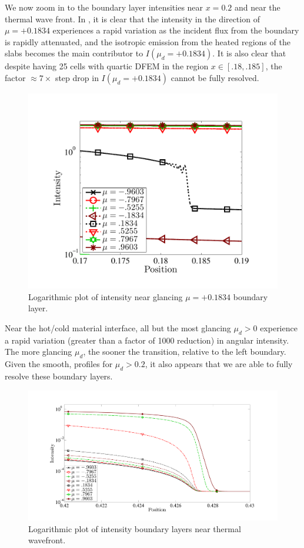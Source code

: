 We now zoom in to the boundary layer intensities near $x=0.2$ and near the thermal wave front.
In , it is clear that the intensity in the direction of $\mu=+0.1834$ experiences a rapid variation as the incident flux from the boundary is rapidly attenuated, and the isotropic emission from the heated regions of the slabs becomes the main contributor to $I(\mu_d = +0.1834)$.
It is also clear that despite having 25 cells with quartic DFEM in the region $x\in[.18,.185]$, the factor $\approx 7\times$ step drop in $I(\mu_d = +0.1834)$ cannot be fully resolved. 
\begin{figure}[!ht]
\centering
\includegraphics[width=12cm,trim=0.5in  0.2in 0.5in 0.5in,clip=true]{chapter6_grey_radtran/Dissertation_Data/S8_pos_mu_glance_boundary_layer_log.pdf}
\caption{Logarithmic plot of intensity near glancing $\mu=+0.1834$ boundary layer. }
\label{fig:s8_zoom_glance}
\end{figure}

Near the hot/cold material interface, all but the most glancing $\mu_d > 0$ experience a rapid variation (greater than a factor of 1000 reduction) in angular intensity.
The more glancing $\mu_d$, the sooner the transition, relative to the left boundary.
Given the smooth, profiles for $\mu_d > 0.2$, it also appears that we are able to fully resolve these boundary layers. 
\begin{figure}[!ht]
\centering
\includegraphics[width=16cm,trim=1.5in  0.2in 0.5in 0.75in,clip=true]{chapter6_grey_radtran/Dissertation_Data/S8_thermal_wavefront_boundary_layer.pdf}
\caption{Logarithmic plot of intensity boundary layers near thermal wavefront.}
\label{fig:s8_zoom_thermal_wavefront}
\end{figure}

